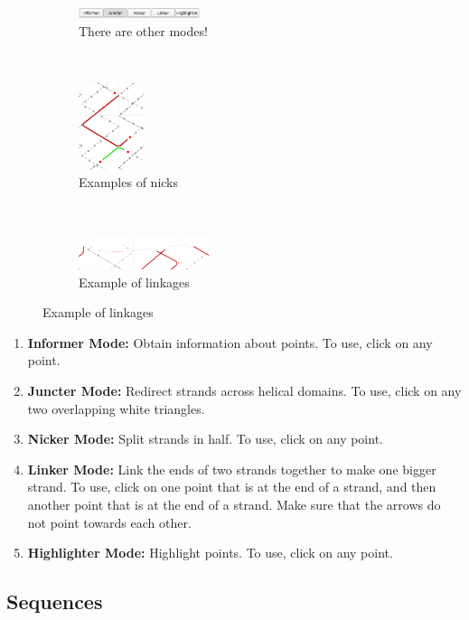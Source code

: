 \documentclass[
titlepage,
fontsize=12pt
]{article}
\begin{document}
	\begin{figure}[h]
		\caption{Advanced NATuG features}
		\centering
		\begin{subfigure}{.3\textwidth}
			\centering
			\includegraphics[width=1.4in]{juncter-activated.png}
			\caption{There are other modes!}
		\end{subfigure}%
		~
		\begin{subfigure}{.3\textwidth}
			\centering
			\includegraphics[height=1in]{nick-examples.png}
			\caption{Examples of nicks}
		\end{subfigure}%
		~
		\begin{subfigure}{.3\textwidth}
			\centering
			\includegraphics[width=1.5in]{linkage-example.png}
			\caption{Example of linkages}
		\end{subfigure}
	\end{figure}
	
	\begin{enumerate}
		\item \textbf{Informer Mode:} Obtain information about points. To use, click on any point.
		\item \textbf{Juncter Mode:} Redirect strands across helical domains. To use, click on any two overlapping white triangles.
		\item \textbf{Nicker Mode:} Split strands in half. To use, click on any point.
		\item \textbf{Linker Mode:} Link the ends of two strands together to make one bigger strand. To use, click on one point that is at the end of a strand, and then another point that is at the end of a strand. Make sure that the arrows do not point towards each other.
		\item \textbf{Highlighter Mode:} Highlight points. To use, click on any point.
	\end{enumerate}
	
	\subsection{Sequences}
	
\end{document}
